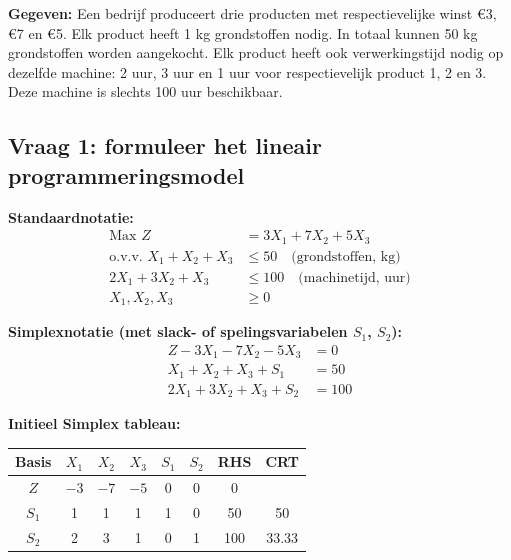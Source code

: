 \documentclass[a4paper,11pt]{article}
\begin{document}
\begin{oefenblok}

    \textbf{Gegeven:} Een bedrijf produceert drie producten met respectievelijke winst €3, €7 en €5. Elk product heeft 1 kg grondstoffen nodig. In totaal kunnen 50 kg grondstoffen worden aangekocht. Elk product heeft ook verwerkingstijd nodig op dezelfde machine: 2 uur, 3 uur en 1 uur voor respectievelijk product 1, 2 en 3. Deze machine is slechts 100 uur beschikbaar.

    \subsection*{Vraag 1: formuleer het lineair programmeringsmodel}

    \textbf{Standaardnotatie:}
    \begin{align*}
        \text{Max } Z                             & = 3X_1 + 7X_2 + 5X_3 \\
        \text{o.v.v. } X_1 + X_2 + X_3            & \leq 50 \quad \text{(grondstoffen, kg)} \\
        2X_1 + 3X_2 + X_3                          & \leq 100 \quad \text{(machinetijd, uur)} \\
        X_1, X_2, X_3                              & \geq 0
    \end{align*}

    \textbf{Simplexnotatie (met slack- of spelingsvariabelen $S_1$, $S_2$):}
    \begin{align*}
        Z - 3X_1 - 7X_2 - 5X_3  & = 0   \\
        X_1 + X_2 + X_3 + S_1   & = 50  \\
        2X_1 + 3X_2 + X_3 + S_2 & = 100
    \end{align*}

    \textbf{Initieel Simplex tableau:}

    \begin{center}
        \begin{tabular}{c|ccccc|c|c}
            \hline
            Basis & $X_1$ & $X_2$ & $X_3$ & $S_1$ & $S_2$ & RHS & CRT   \\
            \hline
            $Z$   & $-3$  & $-7$  & $-5$  & 0     & 0     & 0   &       \\
            $S_1$ & 1     & 1     & 1     & 1     & 0     & 50  & 50    \\
            $S_2$ & 2     & 3     & 1     & 0     & 1     & 100 & 33.33 \\
            \hline
        \end{tabular}
    \end{center}


\end{oefenblok}
\end{document}
